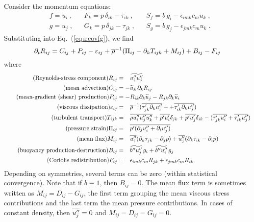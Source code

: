 Consider the momentum equations:
\begin{align}
  &f = u_i\;, && F_k=p\,\delta_{ik}-\tau_{ik}\;, && S_f = b\, g_i- \epsilon_{imk} c_m u_k\;,\\
  &g = u_j\;, && G_k=p\,\delta_{jk}-\tau_{jk}\;, && S_g = b\, g_j- \epsilon_{jmk} c_m u_k\;.
\end{align}
Substituting into Eq.~(\ref{equ:covfg}), we find
\begin{equation}\label{equ:Rij}
  \pt{R_{ij}}{t}  = C_{ij}  +P_{ij} -\varepsilon_{ij}
  +\avr{\rho}^{-1} ( \Pi_{ij} - \pt{T_{ijk}}{k} + M_{ij} ) +B_{ij} -F_{ij}
\end{equation}
where
\begin{align}
  \tag{Reynolds-stress component}
    R_{ij}  &=\phantom{-}\avf{u_i''u_j''}\\
  \tag{mean advection}
    C_{ij}  &=-\avf{u}_k\,\pt{R_{ij}}{k}\\
  \tag{mean-gradient (shear) production}
    P_{ij}  &=-R_{ik} \pt{\avf{u}_j}{k} -R_{jk} \pt{\avf{u}_i}{k} \\
  \tag{viscous dissipation}
    \varepsilon_{ij} &=\phantom{-} \avr{\rho}^{-1} ( \avr{\tau'_{jk} \pt{u''_i}{k}} +
                                                    +\avr{\tau'_{ik} \pt{u''_j}{k}} )\\
  \tag{turbulent transport}
    T_{ijk} &=\phantom{-} \avr{\rho u''_i u''_j u''_k}
                         +\avr{p'u'_i}\delta_{jk} +\avr{p'u'_j}\delta_{ik}
                         -( \avr{\tau'_{jk} u''_i} +\avr{\tau'_{ik} u''_j} )\\
  \tag{pressure strain}
    \Pi_{ij}&=\phantom{-} \avr{ p' ( \pt{u''_i}{j}+ \pt{u''_j}{i} ) }\\
  \tag{mean flux}
    M_{ij}  &=\phantom{-} \avr{u''_i} ( \pt{\bar{\tau}_{jk}}{k} - \pt{\bar{p}}{j} )
                         +\avr{u''_j} ( \pt{\bar{\tau}_{ik}}{k} - \pt{\bar{p}}{i} )\\
  \tag{buoyancy production-destruction}
    B_{ij}  &=\phantom{-} \avf{b''u''_j}\,g_i+\avf{b''u''_i}\,g_j \\
  \tag{Coriolis redistribution}
    F_{ij}  &=\phantom{-} \epsilon_{imk}c_m R_{jk} +\epsilon_{jmk}c_m R_{ik}
\end{align}
Depending on symmetries, several terms can be zero (within statistical convergence). Note that if $b\equiv 1$, then $B_{ij}=0$. The mean flux term is sometimes written as $M_{ij}=D_{ij}-G_{ij}$, the first term grouping the mean viscous stress contributions and the last term the mean pressure contributions. In cases of constant density, then $\avr{u''_j}=0$ and $M_{ij}=D_{ij}=G_{ij}=0$.

